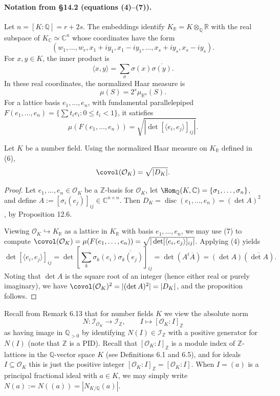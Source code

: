 \paragraph{Notation from \S14.2 (equations (4)--(7)).}
Let $n=[K:\mathbb Q]=r+2s$. The embeddings identify $K_{\mathbb R}=K\otimes_{\mathbb Q}\mathbb R$ with the real subspace of $K_{\mathbb C}\simeq\mathbb C^n$ whose coordinates have the form
\[
(w_1,\ldots,w_r,x_1+iy_1,x_1-iy_1,\ldots,x_s+iy_s,x_s-iy_s).\tag{5}
\]
For $x,y\in K$, the inner product is
\[
\langle x,y\rangle=\sum_{\sigma}\sigma(x)\overline{\sigma(y)}.\tag{4}
\]
In these real coordinates, the normalized Haar measure is
\[
\mu(S)=2^s\mu_{\mathbb R^n}(S).\tag{6}
\]
For a lattice basis $e_1,\ldots,e_n$, with fundamental parallelepiped
$F(e_1,\ldots,e_n)=\{\sum t_i e_i:0\le t_i<1\}$, it satisfies
\[
\mu(F(e_1,\ldots,e_n))=\sqrt{|\det[\langle e_i,e_j\rangle]_{ij}|}.\tag{7}
\]

\begin{proposition}[14.16]
Let $K$ be a number field. Using the normalized Haar measure on $K_{\mathbb R}$ defined in (6),
\[
\covol(\mathcal O_K)=\sqrt{|D_K|}.
\]
\end{proposition}
\begin{proof}
Let $e_1,\ldots,e_n\in\mathcal O_K$ be a $\mathbb Z$-basis for $\mathcal O_K$, let $\Hom_{\mathbb Q}(K,\mathbb C)=\{\sigma_1,\ldots,\sigma_n\}$, and define $A:=[\sigma_i(e_j)]_{ij}\in\mathbb C^{n\times n}$. Then $D_K=\operatorname{disc}(e_1,\ldots,e_n)=(\det A)^2$, by Proposition 12.6.

Viewing $\mathcal O_K\hookrightarrow K_{\mathbb R}$ as a lattice in $K_{\mathbb R}$ with basis $e_1,\ldots,e_n$, we may use (7) to compute $\covol(\mathcal O_K)=\mu(F(e_1,\ldots,e_n))=\sqrt{|\det[\langle e_i,e_j\rangle]_{ij}|}$. Applying (4) yields
\[
\det[\langle e_i,e_j\rangle]_{ij}
=\det\left[\sum_k\sigma_k(e_i)\overline{\sigma_k(e_j)}\right]_{ij}
=\det(A^t\overline A)=(\det A)(\overline{\det A}).
\]
Noting that $\det A$ is the square root of an integer (hence either real or purely imaginary), we have $\covol(\mathcal O_K)^2=|(\det A)^2|=|D_K|$, and the proposition follows.
\end{proof}

Recall from Remark 6.13 that for number fields $K$ we view the absolute norm
\[
N:\mathcal I_{\mathcal O_K}\longrightarrow\mathcal I_{\mathbb Z},\qquad
I\longmapsto[\mathcal O_K:I]_{\mathbb Z}
\]
as having image in $\mathbb Q_{>0}$ by identifying $N(I)\in\mathcal I_{\mathbb Z}$ with a positive generator for $N(I)$ (note that $\mathbb Z$ is a PID). Recall that $[\mathcal O_K:I]_{\mathbb Z}$ is a module index of $\mathbb Z$-lattices in the $\mathbb Q$-vector space $K$ (see Definitions 6.1 and 6.5), and for ideals $I\subseteq\mathcal O_K$ this is just the positive integer $[\mathcal O_K:I]_{\mathbb Z}=[\mathcal O_K:I]$. When $I=(a)$ is a principal fractional ideal with $a\in K$, we may simply write $N(a):=N((a))=|N_{K/\mathbb Q}(a)|$.

